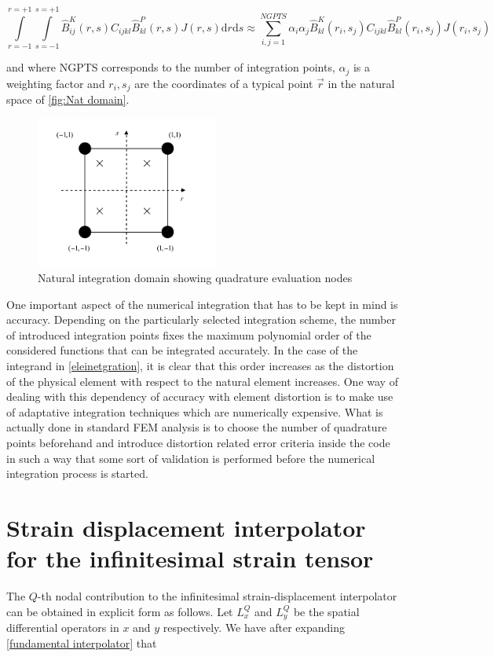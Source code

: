 \begin{equation}
\int\limits_{r=-1}^{r=+1}\int\limits_{s=-1}^{s=+1} \hat{B}_{ij}^K(r,s) C_{ijkl} \hat{B}_{kl}^P(r,s)J(r,s) \mathrm{d}r\mathrm{d}s\approx \sum_{i,j=1}^{NGPTS} \alpha_i \alpha_j \hat{B}_{kl}^K(r_i,s_j)C_{ijkl} \hat{B}_{kl}^P(r_i,s_j) J(r_i,s_j)
\label{eleinetgration}
\end{equation}

	 											
and where NGPTS corresponds to the number of integration points, $\alpha_j$ is a weighting factor and $r_i,s_j$   are the coordinates of a typical point $\vec{r}$ in the natural space of \cref{fig:Nat domain}.

 
\begin{figure}[h]
\centering
\includegraphics[width=6cm]{img/figure4.pdf}
\caption{Natural integration domain showing quadrature evaluation nodes}
\label{fig:integration domain}
\end{figure}	 


One important aspect of the numerical integration that has to be kept in mind is accuracy.  Depending on the particularly selected integration scheme, the number of introduced integration points fixes the maximum polynomial order of the considered functions that can be integrated accurately.  In the case of the integrand in \cref{eleinetgration}, it is clear that this order increases as the distortion of the physical element  with respect to the natural element increases.  One way of dealing with this dependency of accuracy with element distortion is to make use of adaptative integration techniques which are numerically expensive.  What is actually done in standard FEM analysis is to choose the number of quadrature points beforehand and introduce distortion related error criteria inside the code in such a way that some sort of validation is performed before the numerical integration process is started.

\section*{Strain displacement interpolator for the infinitesimal strain tensor}
The $Q$-th nodal contribution to the infinitesimal strain-displacement interpolator can be obtained in explicit form as follows. Let $L_x^Q$ and $L_y^Q$ be the spatial differential operators in $x$ and $y$ respectively. We have after expanding \cref{fundamental interpolator}  that

